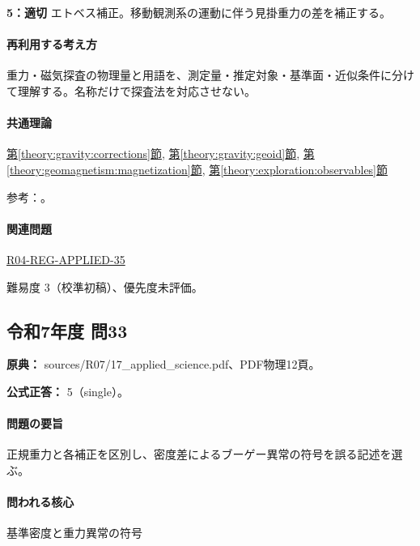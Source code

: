 \noindent\textbf{5：適切} エトベス補正。移動観測系の運動に伴う見掛重力の差を補正する。\par

\paragraph{再利用する考え方} 重力・磁気探査の物理量と用語を、測定量・推定対象・基準面・近似条件に分けて理解する。名称だけで探査法を対応させない。

\paragraph{共通理論} \hyperref[theory:gravity:corrections]{第\ref*{theory:gravity:corrections}節}, \hyperref[theory:gravity:geoid]{第\ref*{theory:gravity:geoid}節}, \hyperref[theory:geomagnetism:magnetization]{第\ref*{theory:geomagnetism:magnetization}節}, \hyperref[theory:exploration:observables]{第\ref*{theory:exploration:observables}節}

\par 参考：\cite{gsi_gravity_definitions,kanaya_okuma2011,sato_lei2009_ae}。

\paragraph{関連問題} \hyperref[q:r04-reg-applied-35]{R04-REG-APPLIED-35}

\par 難易度 3（校準初稿）、優先度未評価。

\subsection{令和7年度 問33}
\label{q:r07-reg-applied-33}

\noindent\textbf{原典：} sources/R07/17\_applied\_science.pdf、PDF物理12頁。

\textbf{公式正答：} 5（single）。

\paragraph{問題の要旨} 正規重力と各補正を区別し、密度差によるブーゲー異常の符号を誤る記述を選ぶ。

\paragraph{問われる核心} 基準密度と重力異常の符号

